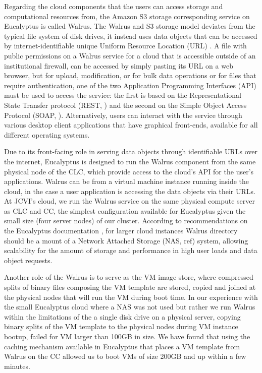 \documentclass[10pt]{bmc_article}
\newenvironment{bmcformat}{\baselineskip20pt\sloppy\setboolean{publ}{false}}{\baselineskip20pt\sloppy}
\begin{document}
\begin{bmcformat}
Regarding the cloud components that the users can access storage and computational resources from, the Amazon S3 storage corresponding 
service on Eucalyptus is called Walrus.  The Walrus and S3 storage model deviates from the typical file system of disk drives, it instead uses 
data objects that can be accessed by internet-identifiable unique Uniform Resource Location (URL) . 
A file with public permissions on a Walrus service for a cloud that is accessible outside of an institutional firewall, can be accessed by simply 
pasting its URL on a web browser, but for upload, modification, or for bulk data operations or for files that require authentication, one of the 
two Application Programming Interfaces (API) must be used to  access the service: the first is based on the Representational State Transfer 
protocol (REST, \cite{fielding2000})  and the second on the Simple Object Access Protocol (SOAP, \cite{soap}).  Alternatively, users can interact 
with the service through various desktop client applications  that have graphical front-ends, available for all different operating systems\cite{cyberduck, s3browse,s3fox}. \pb


Due to its front-facing role in serving data objects through identifiable URLs over the internet, Eucalyptus is designed to run the Walrus
component from the same physical node of the CLC, which provide access to the cloud's API for the user's applications. Walrus can be 
from a virtual machine instance running inside the cloud, in the case a user application is accessing the data objects via their URLs. At 
JCVI's cloud, we run the Walrus service on the same physical compute server as CLC and CC, the simplest configuration available for 
Eucalyptus given the small size (four server nodes) of our cluster. According to recommendations on the  Eucalyptus documentation \cite{eucadocs},
for larger cloud instances Walrus directory should be a mount of a Network Attached Storage (NAS, ref) system, allowing scalability for the 
amount of storage and performance in high user loads and data object requests. 

Another role of the Walrus is to serve as the VM image store, where compressed splits of binary files composing the VM template are stored, 
copied and joined at the physical nodes that will run the VM during boot time. In our experience with the small Eucalyptus cloud where a NAS 
was not used but rather we run Walrus within the limitations of the a single disk drive on a physical server, copying binary splits of the VM 
template to the physical nodes  during VM instance bootup, failed for VM larger than 100GB in size. We have found that using the caching 
mechanism available in Eucalyptus that places a VM template from Walrus on the CC \cite{eucacache} allowed us to boot VMs of size 200GB
and up within a few minutes.


\end{bmcformat}
\end{document}
